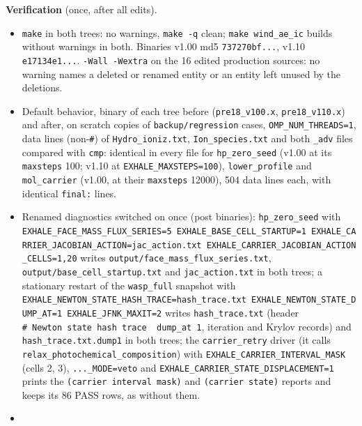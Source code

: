 \documentclass[english,a4paper]{my_memo}
\providecommand{\tightlist}{\setlength{\itemsep}{0pt}\setlength{\parskip}{0pt}}
\begin{document}
\textbf{Verification} (once, after all edits).

\begin{itemize}
\tightlist
\item
  \texttt{make} in both trees: no warnings, \texttt{make\ -q} clean; \texttt{make\ wind\_ae\_ic} builds without warnings in both. Binaries v1.00 md5 \texttt{737270bf...}, v1.10 \texttt{e17134e1...}. \texttt{-Wall\ -Wextra} on the 16 edited production sources: no warning names a deleted or renamed entity or an entity left unused by the deletions.
\item
  Default behavior, binary of each tree before (\texttt{pre18\_v100.x}, \texttt{pre18\_v110.x}) and after, on scratch copies of \texttt{backup/regression} cases, \texttt{OMP\_NUM\_THREADS=1}, data lines (non-\texttt{\#}) of \texttt{Hydro\_ioniz.txt}, \texttt{Ion\_species.txt} and both \texttt{\_adv} files compared with \texttt{cmp}: identical in every file for \texttt{hp\_zero\_seed} (v1.00 at its \texttt{maxsteps} 100; v1.10 at \texttt{EXHALE\_MAXSTEPS=100}), \texttt{lower\_profile} and \texttt{mol\_carrier} (v1.00, at their \texttt{maxsteps} 12000), 504 data lines each, with identical \texttt{final:} lines.
\item
  Renamed diagnostics switched on once (post binaries): \texttt{hp\_zero\_seed} with \texttt{EXHALE\_FACE\_MASS\_FLUX\_SERIES=5\ EXHALE\_BASE\_CELL\_STARTUP=1\ EXHALE\_CARRIER\_JACOBIAN\_ACTION=jac\_action.txt\ EXHALE\_CARRIER\_JACOBIAN\_ACTION\_CELLS=1,20} writes \texttt{output/face\_mass\_flux\_series.txt}, \texttt{output/base\_cell\_startup.txt} and \texttt{jac\_action.txt} in both trees; a stationary restart of the \texttt{wasp\_full} snapshot with \texttt{EXHALE\_NEWTON\_STATE\_HASH\_TRACE=hash\_trace.txt\ EXHALE\_NEWTON\_STATE\_DUMP\_AT=1\ EXHALE\_JFNK\_MAXIT=2} writes \texttt{hash\_trace.txt} (header \texttt{\#\ Newton\ state\ hash\ trace\ \ dump\_at\ 1}, iteration and Krylov records) and \texttt{hash\_trace.txt.dump1} in both trees; the \texttt{carrier\_retry} driver (it calls \texttt{relax\_photochemical\_composition}) with \texttt{EXHALE\_CARRIER\_INTERVAL\_MASK} (cells 2, 3), \texttt{...\_MODE=veto} and \texttt{EXHALE\_CARRIER\_STATE\_DISPLACEMENT=1} prints the \texttt{(carrier\ interval\ mask)} and \texttt{(carrier\ state)} reports and keeps its 86 PASS rows, as without them.
\item

\end{itemize}
\end{document}
